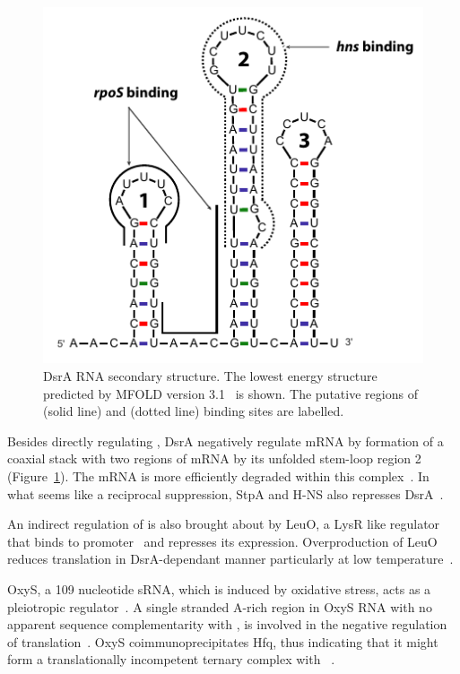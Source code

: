 \begin{figure}[tbp]
\centering
\includegraphics{figures/chap1_dsra}
\caption[DsrA sturcture]{DsrA RNA secondary structure. The lowest
energy structure predicted by MFOLD version
3.1~\citep{Mathews1999} is shown. The putative regions of 
(solid line) and  (dotted line) binding sites are
labelled.} \label{chap1_dsra}
\end{figure}

Besides directly regulating , DsrA negatively regulate
 mRNA by formation of a coaxial stack with two regions of
 mRNA by its unfolded stem-loop region 2
(Figure~\ref{chap1_dsra})\@. The  mRNA is more efficiently
degraded within this complex~\citep{Lease2000b}. In what seems
like a reciprocal suppression, StpA and H-NS also represses
DsrA~\citep{Lease2000b}.

An indirect regulation of  is also brought about by LeuO,
a LysR like regulator that binds to 
promoter~\citep{Repoila2001} and represses its expression.
Overproduction of LeuO reduces  translation in
DsrA-dependant manner particularly at low
temperature~\citep{Klauck1997}.

OxyS, a 109 nucleotide sRNA, which is induced by oxidative stress,
acts as a pleiotropic regulator~\citep{Altuvia1997}. A single
stranded A-rich region in OxyS RNA with no apparent sequence
complementarity with , is involved in the negative
regulation of  translation~\citep{Zhang1998}. OxyS
coimmunoprecipitates Hfq, thus indicating that it might form a
translationally incompetent ternary complex with
~\citep{Zhang1998}.

